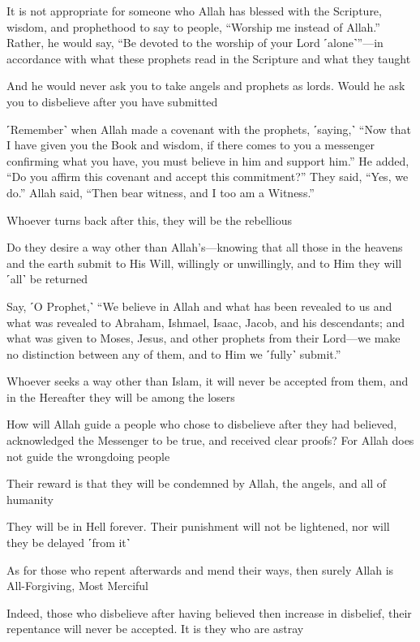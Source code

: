 It is not appropriate for someone who Allah has blessed with the Scripture, wisdom, and prophethood to say to people, “Worship me instead of Allah.” Rather, he would say, “Be devoted to the worship of your Lord ˹alone˺”—in accordance with what these prophets read in the Scripture and what they taught

And he would never ask you to take angels and prophets as lords. Would he ask you to disbelieve after you have submitted

˹Remember˺ when Allah made a covenant with the prophets, ˹saying,˺ “Now that I have given you the Book and wisdom, if there comes to you a messenger confirming what you have, you must believe in him and support him.” He added, “Do you affirm this covenant and accept this commitment?” They said, “Yes, we do.” Allah said, “Then bear witness, and I too am a Witness.”

Whoever turns back after this, they will be the rebellious

Do they desire a way other than Allah’s—knowing that all those in the heavens and the earth submit to His Will, willingly or unwillingly, and to Him they will ˹all˺ be returned

Say, ˹O Prophet,˺ “We believe in Allah and what has been revealed to us and what was revealed to Abraham, Ishmael, Isaac, Jacob, and his descendants; and what was given to Moses, Jesus, and other prophets from their Lord—we make no distinction between any of them, and to Him we ˹fully˺ submit.”

Whoever seeks a way other than Islam, it will never be accepted from them, and in the Hereafter they will be among the losers

How will Allah guide a people who chose to disbelieve after they had believed, acknowledged the Messenger to be true, and received clear proofs? For Allah does not guide the wrongdoing people

Their reward is that they will be condemned by Allah, the angels, and all of humanity

They will be in Hell forever. Their punishment will not be lightened, nor will they be delayed ˹from it˺

As for those who repent afterwards and mend their ways, then surely Allah is All-Forgiving, Most Merciful

Indeed, those who disbelieve after having believed then increase in disbelief, their repentance will never be accepted. It is they who are astray

